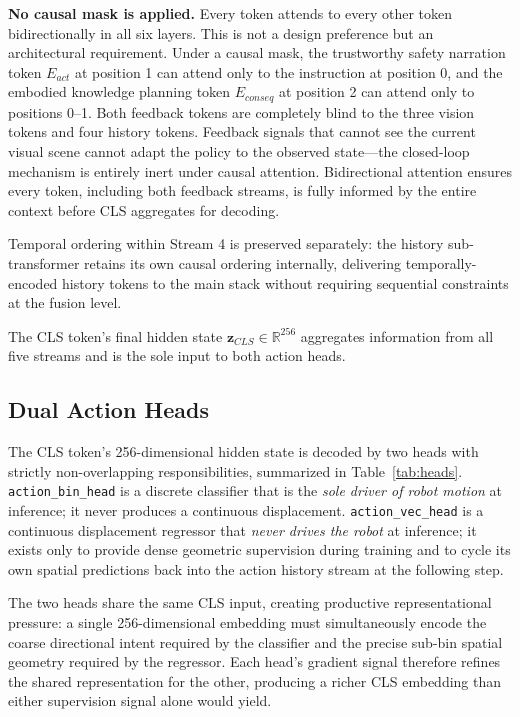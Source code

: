 \documentclass[letterpaper]{article} %
\begin{document}
\textbf{No causal mask is applied.} Every token attends to every other token bidirectionally in all six layers. This is not a design preference but an architectural requirement. Under a causal mask, the trustworthy safety narration token $E_{act}$ at position 1 can attend only to the instruction at position 0, and the embodied knowledge planning token $E_{conseq}$ at position 2 can attend only to positions 0--1. Both feedback tokens are completely blind to the three vision tokens and four history tokens. Feedback signals that cannot see the current visual scene cannot adapt the policy to the observed state---the closed-loop mechanism is entirely inert under causal attention. Bidirectional attention ensures every token, including both feedback streams, is fully informed by the entire context before CLS aggregates for decoding.

Temporal ordering within Stream 4 is preserved separately: the history sub-transformer retains its own causal ordering internally, delivering temporally-encoded history tokens to the main stack without requiring sequential constraints at the fusion level.

The CLS token's final hidden state $\mathbf{z}_{CLS} \in \mathbb{R}^{256}$ aggregates information from all five streams and is the sole input to both action heads.

\subsection{Dual Action Heads}

The CLS token's 256-dimensional hidden state is decoded by two heads with strictly non-overlapping responsibilities, summarized in Table~\ref{tab:heads}. \texttt{action\_bin\_head} is a discrete classifier that is the \emph{sole driver of robot motion} at inference; it never produces a continuous displacement. \texttt{action\_vec\_head} is a continuous displacement regressor that \emph{never drives the robot} at inference; it exists only to provide dense geometric supervision during training and to cycle its own spatial predictions back into the action history stream at the following step.

The two heads share the same CLS input, creating productive representational pressure: a single 256-dimensional embedding must simultaneously encode the coarse directional intent required by the classifier and the precise sub-bin spatial geometry required by the regressor. Each head's gradient signal therefore refines the shared representation for the other, producing a richer CLS embedding than either supervision signal alone would yield.
\end{document}
